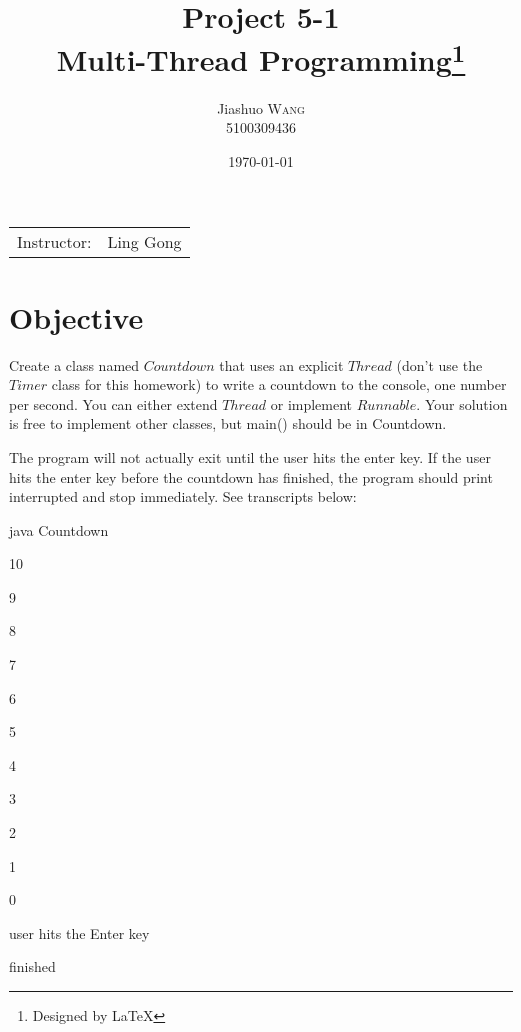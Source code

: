 \documentclass{article}
\title{Project 5-1 \\ Multi-Thread Programming\thanks{Designed by \LaTeX}} %
\author{Jiashuo \textsc{Wang} \\ 5100309436} %
\date{\today} %
\begin{document}
\maketitle %
\thispagestyle{fancy} %

\begin{center}
\begin{tabular}{l r}
Instructor: & Ling Gong %
\end{tabular}
\end{center}




\section{Objective}

Create a class named $Countdown$ that uses an explicit $Thread$ (don't use the $Timer$ class for this homework) to write a countdown to the console, one number per second. You can either extend $Thread$ or implement $Runnable$. Your solution is free to implement other classes, but main() should be in Countdown.

The program will not actually exit until the user hits the enter key. If the user hits the enter key before the countdown has finished, the program should print interrupted and stop immediately. See transcripts below:

java Countdown

10

9

8

7

6

5

4

3

2

1

0

user hits the Enter key

finished
\end{document}
